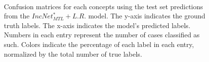 \begin{figure}[ht]
\\
\caption{Confusion matrices for each concepts using the test set predictions
from the $IncNet^*_{MTL}+L.R.$ model. The y-axis indicates the ground truth labels. The x-axis indicates the model’s predicted labels. Numbers in each entry represent
the number of cases classified as such. Colors indicate the percentage of each
label in each entry, normalized by the total number of true labels.}
\label{CMincNetMTLLR}
\end{figure}
\clearpage
